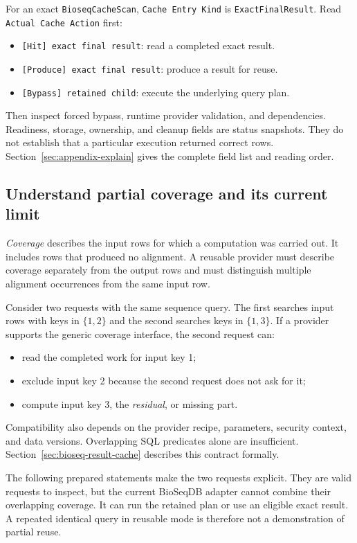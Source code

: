 For an exact \texttt{BioseqCacheScan}, \texttt{Cache Entry Kind} is
\texttt{ExactFinalResult}. Read \texttt{Actual Cache Action} first:
\begin{itemize}
  \item \texttt{[Hit] exact final result}: read a completed exact result.
  \item \texttt{[Produce] exact final result}: produce a result for reuse.
  \item \texttt{[Bypass] retained child}: execute the underlying query plan.
\end{itemize}
Then inspect forced bypass, runtime provider validation, and dependencies.
Readiness, storage, ownership, and cleanup fields are status snapshots.
They do not establish that a particular execution returned correct rows.
Section~\ref{sec:appendix-explain} gives the complete field list and reading
order.

\subsection{Understand partial coverage and its current limit}

\emph{Coverage} describes the input rows for which a computation was carried
out. It includes rows that produced no alignment. A reusable provider must
describe coverage separately from the output rows and must distinguish
multiple alignment occurrences from the same input row.

Consider two requests with the same sequence query. The first searches input
rows with keys in $\{1,2\}$ and the second searches keys in $\{1,3\}$.
If a provider supports the generic coverage interface, the second request can:
\begin{itemize}
  \item read the completed work for input key 1;
  \item exclude input key 2 because the second request does not ask for it;
  \item compute input key 3, the \emph{residual}, or missing part.
\end{itemize}
Compatibility also depends on the provider recipe, parameters, security
context, and data versions. Overlapping SQL predicates alone are insufficient.
Section~\ref{sec:bioseq-result-cache} describes this contract formally.

The following prepared statements make the two requests explicit. They are
valid requests to inspect, but the current BioSeqDB adapter cannot combine
their overlapping coverage. It can run the retained plan or use an eligible
exact result. A repeated identical query in reusable mode is therefore not
a demonstration of partial reuse.

